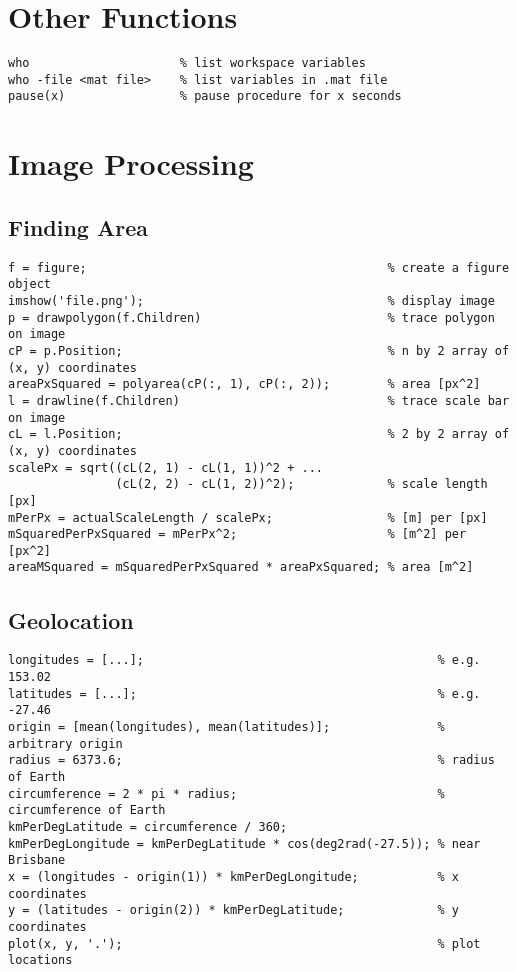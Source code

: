 \documentclass{article}
\begin{document}
\section*{Other Functions}
\begin{lstlisting}
who                     % list workspace variables  
who -file <mat file>    % list variables in .mat file 
pause(x)                % pause procedure for x seconds 
\end{lstlisting}
\section*{Image Processing}
\subsection*{Finding Area}
\begin{lstlisting}
f = figure;                                          % create a figure object
imshow('file.png');                                  % display image 
p = drawpolygon(f.Children)                          % trace polygon on image
cP = p.Position;                                     % n by 2 array of (x, y) coordinates
areaPxSquared = polyarea(cP(:, 1), cP(:, 2));        % area [px^2]
l = drawline(f.Children)                             % trace scale bar on image
cL = l.Position;                                     % 2 by 2 array of (x, y) coordinates
scalePx = sqrt((cL(2, 1) - cL(1, 1))^2 + ...
               (cL(2, 2) - cL(1, 2))^2);             % scale length [px]
mPerPx = actualScaleLength / scalePx;                % [m] per [px]
mSquaredPerPxSquared = mPerPx^2;                     % [m^2] per [px^2]
areaMSquared = mSquaredPerPxSquared * areaPxSquared; % area [m^2]
\end{lstlisting}
\subsection*{Geolocation}
\begin{lstlisting}
longitudes = [...];                                         % e.g. 153.02
latitudes = [...];                                          % e.g. -27.46
origin = [mean(longitudes), mean(latitudes)];               % arbitrary origin
radius = 6373.6;                                            % radius of Earth
circumference = 2 * pi * radius;                            % circumference of Earth
kmPerDegLatitude = circumference / 360;                     
kmPerDegLongitude = kmPerDegLatitude * cos(deg2rad(-27.5)); % near Brisbane
x = (longitudes - origin(1)) * kmPerDegLongitude;           % x coordinates
y = (latitudes - origin(2)) * kmPerDegLatitude;             % y coordinates
plot(x, y, '.');                                            % plot locations
\end{lstlisting}
\end{document}
